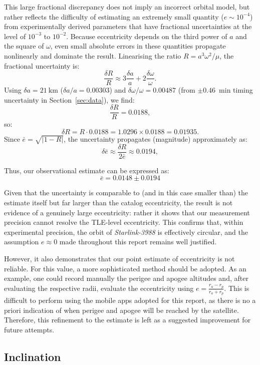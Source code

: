 \documentclass{article}
\begin{document}
This large fractional discrepancy does not imply an incorrect orbital model, but rather reflects the difficulty of estimating an extremely small quantity ($e \sim 10^{-4}$) from experimentally derived parameters that have fractional uncertainties at the level of $10^{-3}$ to $10^{-2}$.  
Because eccentricity depends on the third power of $a$ and the square of $\omega$, even small absolute errors in these quantities propagate nonlinearly and dominate the result.  
Linearising the ratio $R = a^{3}\omega^{2}/\mu$, the fractional uncertainty is:
\[ \frac{\delta R}{R} \approx 3\frac{\delta a}{a} + 2\frac{\delta \omega}{\omega}.
\]
Using $\delta a = 21~\mathrm{km}$ ($\delta a/a = 0.00303$) and $\delta\omega/\omega = 0.00487$ (from $\pm0.46$~min timing uncertainty in Section~\ref{sec:data}), we find:
\[
\frac{\delta R}{R} = 0.0188,
\]
so:
\[
\delta R = R\cdot 0.0188 = 1.0296\times 0.0188 = 0.01935.
\]
Since \(\bar{e}=\sqrt{|1-R|}\), the uncertainty propagates (magnitude) approximately as:
\[
\delta\bar{e} \approx \frac{\delta R}{2\bar{e}} \approx 0.0194,
\]

Thus, our observational estimate can be expressed as:
\[
\boxed{\,\bar{e} = 0.0148 \pm 0.0194\,}
\]

Given that the uncertainty is comparable to (and in this case smaller than) the estimate itself but far larger than the catalog eccentricity, the result is not evidence of a genuinely large eccentricity: rather it shows that our measurement precision cannot resolve the TLE-level eccentricity. This confirms that, within experimental precision, the orbit of \textit{Starlink-3988} is effectively circular, and the assumption $e \approx 0$ made throughout this report remains well justified.

However, it also demonstrates that our point estimate of eccentricity is not reliable. For this value, a more sophisticated method should be adopted. As an example, one could record manually the perigee and apogee altitudes and, after evaluating the respective radii, evaluate the eccentricity using $e = \frac{r_a -r_p}{r_a + r_p}$. This is difficult to perform using the mobile apps adopted for this report, as there is no a priori indication of when perigee and apogee will be reached by the satellite. Therefore, this refinement to the estimate is left as a suggested improvement for future attempts.

\subsection{Inclination}
\end{document}
